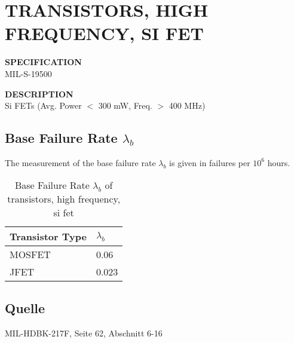\section{TRANSISTORS, HIGH FREQUENCY, SI FET}

\begin{minipage}[t]{0.29\textwidth}
    \textbf{SPECIFICATION}\\
    MIL-S-19500
\end{minipage}
\begin{minipage}[t]{0.7\textwidth}
    \textbf{DESCRIPTION}\\
    {\fontsize{12pt}{12pt}\selectfont Si FETs (Avg. Power $<$ 300 mW, Freq. $>$ 400 MHz)}
\end{minipage}

\subsection{Base Failure Rate $\lambda_b$}
The measurement of the base failure rate $\lambda_b$ is given in failures per $10^6$ hours.
\begin{table}[ht]
{\centering

\begin{tabular}{|p{7.5cm}|p{5cm}|}
    \hline
    \textbf{Transistor Type} & \textbf{$\lambda_b$} \\
    \hline
    MOSFET & 0.06 \\
    \hline
    JFET & 0.023 \\
    \hline
\end{tabular}

\caption{Base Failure Rate $\lambda_b$ of transistors, high frequency, si fet}

\label{tab:bfr_transistors_high_frequency_si_fet}
\par}
\subsection*{Quelle}
MIL-HDBK-217F, Seite 62, Abschnitt 6-16
\end{table}